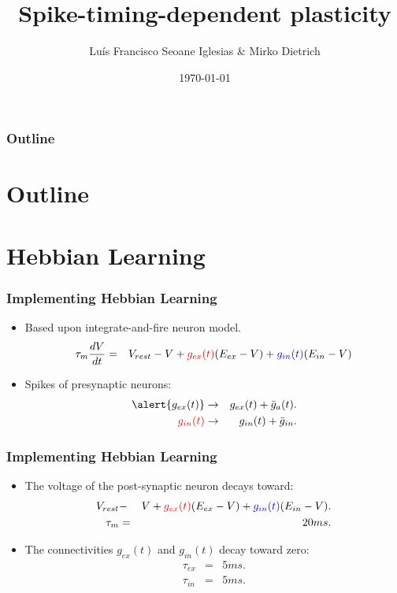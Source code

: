 \documentclass{beamer}
\title{Spike-timing-dependent plasticity}
\author{Lu\'{i}s Francisco Seoane Iglesias \& Mirko Dietrich}
\date{\today}
\begin{document}
\frame{\titlepage}

\AtBeginSection
{
   \begin{frame}
       \frametitle{Outline}
       \tableofcontents[currentsection]
   \end{frame}
}

\section*{Outline}
\frame{
  \tableofcontents
}

\section{Hebbian Learning}
	
	\begin{frame} 
		\frametitle{Implementing Hebbian Learning}
		\begin{itemize} 
			\item Based upon \alert{integrate-and-fire} neuron model. 
					\begin{eqnarray}
						\tau_{m} \frac{dV}{dt} &=& V_{rest} - V + \textcolor{red}{g_{ex}(t)}(E_{ex} - V) + \textcolor{blue}{g_{in}(t)}(E_{in} - V)\nonumber 
					\end{eqnarray}
			\item Spikes of presynaptic neurons: 
					\begin{eqnarray}
						\alert{g_{ex}(t)} &\rightarrow& g_{ex}(t) + \bar{g}_a(t). \nonumber \\
						\textcolor{red}{g_{in}(t)} &\rightarrow& g_{in}(t) + \bar{g}_{in}. \nonumber 
					\end{eqnarray}
		\end{itemize}
	\end{frame}
	
	\begin{frame} 
		\frametitle{Implementing Hebbian Learning}
		\begin{itemize} 
			\item The voltage of the post-synaptic neuron decays toward: 
				\begin{eqnarray}
					V_{rest} &-& V + \textcolor{red}{g_{ex}(t)}(E_{ex} - V) + \textcolor{blue}{g_{in}(t)}(E_{in} - V). \nonumber \\
					\tau_m &=& 20 ms. \nonumber
				\end{eqnarray}
			\item The connectivities $g_{ex}(t)$ and $g_{in}(t)$ decay toward zero: 
				\begin{eqnarray} 
					\tau_{ex} &=& 5ms. \nonumber \\
					\tau_{in} &=& 5ms. \nonumber
				\end{eqnarray}
		\end{itemize}
	\end{frame}
\end{document}
